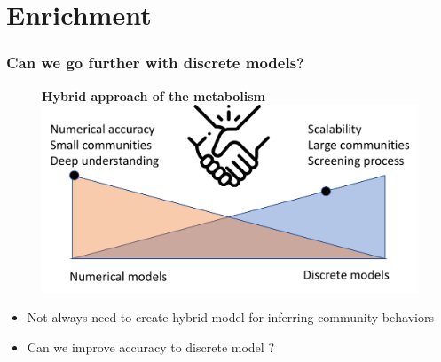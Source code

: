 \documentclass[8pt,usenames,dvipsnames]{beamer}
\begin{document}
\section{Enrichment}

\begin{frame}
\frametitle{Can we go further with discrete models?}
\begin{figure}
\textbf{Hybrid approach of the metabolism}
\includegraphics[width=\textwidth]{figures/further-discrete.pdf}
\end{figure}
\begin{block}{}
\begin{itemize}
\item Not always need to create hybrid model for inferring community behaviors
\item Can we improve accuracy to discrete model ?
\end{itemize}
\end{block}
\end{frame}

\end{document}
